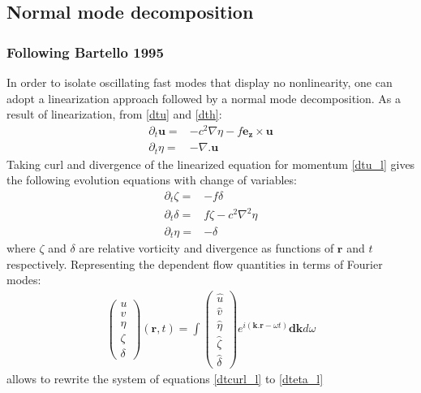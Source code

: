 \subsection{Normal mode decomposition}

\subsubsection{Following Bartello 1995}
In order to isolate oscillating fast modes that display no nonlinearity, one 
can adopt a linearization approach followed by a normal mode decomposition. 
As a result of linearization, from \eqref{dtu} and \eqref{dth}:
  \begin{align}
    \partial_t \mathbf u =& - c^2 \nabla \eta - f\mathbf{e_z} \times \mathbf u 
  \label{dtu_l} \\
    \partial_t \eta =& - \nabla.  \mathbf u \label{dth_l}
  \end{align}
Taking curl and divergence of the linearized equation for momentum 
\eqref{dtu_l} gives the following evolution equations with change of variables:
  \begin{align}
    \partial_t \zeta =& - f \delta
  \label{dtcurl_l} \\ 
    \partial_t \delta =&  f \zeta - c^2 \nabla^2 \eta \label{dtdiv_l} \\
    \partial_t \eta =& - \delta \label{dteta_l}
  \end{align}
where $\zeta$ and $\delta$ are relative vorticity and divergence as functions 
of $\mathbf{r}$ and $t$ respectively. Representing the dependent flow 
quantities in terms of Fourier modes:
  \begin{align}
  \begin{pmatrix}
      u \\ v \\ \eta \\ \zeta \\ \delta
  \end{pmatrix} (\mathbf{r},t)
  = \int  
  \begin{pmatrix}
      \hat{u} \\ \hat{v} \\ \hat{\eta} \\ \hat{\zeta} \\ \hat{\delta}
  \end{pmatrix} e^{i(\mathbf k . \mathbf{r} - \omega t)} \mathbf{dk} d\omega
  \end{align}
allows to rewrite the system of equations \eqref{dtcurl_l} to \eqref{dteta_l} 
